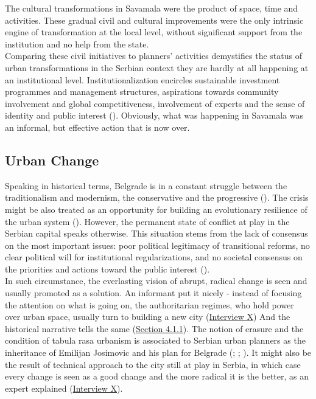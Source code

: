 \documentclass[11pt]{report}
\begin{document}
{The cultural transformations in Savamala were the product of space, time and activities. 
These gradual civil and cultural improvements were the only intrinsic engine of transformation at the local level, without significant support from the institution and no help from the state.
\\

Comparing these civil initiatives to planners' activities demystifies the status of urban transformations in the Serbian context they are hardly at all happening at an institutional level.
Institutionalization encircles sustainable investment programmes and management structures, aspirations towards community involvement and global competitiveness, involvement of experts and the sense of identity and public interest
(\href{Volic}{\cite{volic_belgrade_2012}}).
Obviously, what was happening in Savamala was an informal, but effective action that is now over.
    
\subsection{Urban Change}

Speaking in historical terms, Belgrade is in a constant struggle between the traditionalism and modernism, the conservative and the progressive (\href{Roter}{\cite{doytchinov_modernization_2015}}).
The crisis might be also treated as an opportunity for building an evolutionary resilience of the urban system (\href{Davoudi}{\cite{(Davoudi) from Peric ????}}).
However, the permanent state of conflict at play in the Serbian capital speaks otherwise.
This situation stems from the lack of consensus on the most important issues: poor political legitimacy of transitional reforms, no clear political will for institutional regularizations,  and no societal consensus on the priorities and actions toward the public interest 
(\href{Vujoseivc}{\cite{vujosevic_postsocijalisticka_2010}}).
\\

In such circumstance, the everlasting vision of abrupt, radical change is seen and usually promoted as a solution.   
An informant put it nicely - instead of focusing the attention on what is going on, the authoritarian regimes, who hold power over urban space, usually turn to building a new city
(\href{InterviewX}{Interview X})
And the historical narrative tells the same (\href{Section 4.1.1}{Section 4.1.1}).
The notion of erasure and the condition of tabula rasa urbanism is associated to Serbian urban planners as the inheritance of Emilijan Josimovic and his plan for Belgrade (\href{Maksimovic}{\cite{MaksimovicXXXX}}; \href{Perovic}{\cite{PerovicXXXX}}; \href{Blagojevic}{\cite{blagojevic_urban_2009}}).
It might also be the result of technical approach to the city still at play in Serbia, in which case every change is seen as a good change and the more radical it is the better, as an expert explained
(\href{InterviewX}{Interview X}).
\\

}
\end{document}
